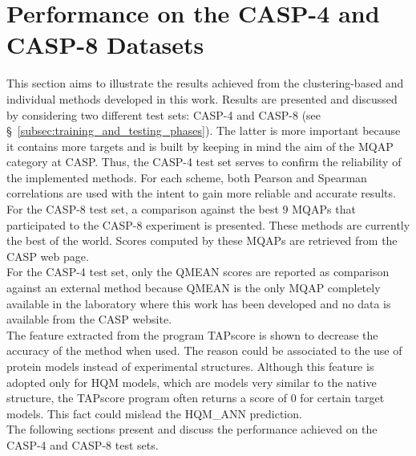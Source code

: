 \section{Performance on the CASP-4 and CASP-8 Datasets}
This section aims to illustrate the results achieved from the clustering-based and individual methods developed in this work. Results are presented and discussed by considering two different test sets: CASP-4 and CASP-8 (see \S~\ref{subsec:training_and_testing_phases}). The latter is more important because it contains more targets and is built by keeping in mind the aim of the MQAP category at CASP. Thus, the CASP-4 test set serves to confirm the reliability of the implemented methods. For each scheme, both Pearson and Spearman correlations are used with the intent to gain more reliable and accurate results. \\
For the CASP-8 test set, a comparison against the best $9$ MQAPs that participated to the CASP-8 experiment is presented. These methods are currently the best of the world. Scores computed by these MQAPs are retrieved from the CASP web page.\\
For the CASP-4 test set, only the QMEAN scores are reported as comparison against an external method because QMEAN is the only MQAP completely available in the laboratory where this work has been developed and no data is available from the CASP website.\\
The feature extracted from the program TAPscore is shown to decrease the accuracy of the method when used. The reason could be associated to the use of protein models instead of experimental structures. Although this feature is adopted only for HQM models, which are models very similar to the native structure, the TAPscore program often returns a score of $0$ for certain target models. This fact could mislead the HQM\_ANN prediction.\\
The following sections present and discuss the performance achieved on the CASP-4 and CASP-8 test sets.


